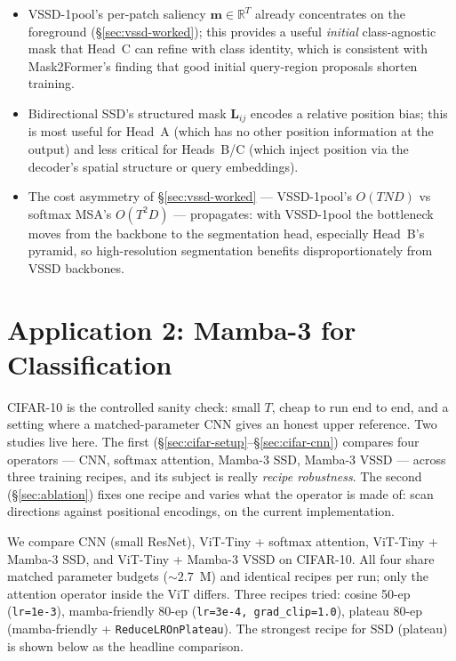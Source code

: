 \documentclass[11pt,a4paper]{article}
\begin{document}
\begin{itemize}
  \item VSSD-1pool's per-patch saliency
        $\bm{m}\in\mathbb{R}^{T}$ already concentrates on the
        foreground (\S\ref{sec:vssd-worked}); this provides a useful
        \emph{initial} class-agnostic mask that Head~C can refine
        with class identity, which is consistent with Mask2Former's
        finding that good initial query-region proposals shorten
        training.
  \item Bidirectional SSD's structured mask $\bm{L}_{ij}$ encodes a
        relative position bias; this is most useful for Head~A
        (which has no other position information at the output) and
        less critical for Heads~B/C (which inject position via the
        decoder's spatial structure or query embeddings).
  \item The cost asymmetry of \S\ref{sec:vssd-worked} — VSSD-1pool's
        $O(TND)$ vs softmax MSA's $O(T^2D)$ — propagates: with VSSD-1pool
        the bottleneck moves from the backbone to the segmentation
        head, especially Head~B's pyramid, so high-resolution
        segmentation benefits disproportionately from VSSD backbones.
\end{itemize}

\section{Application 2: Mamba-3 for Classification}
\label{sec:cifar}

CIFAR-10 is the controlled sanity check: small $T$, cheap to run end to end, and a
setting where a matched-parameter CNN gives an honest upper reference. Two studies
live here. The first (\S\ref{sec:cifar-setup}--\S\ref{sec:cifar-cnn}) compares four
operators --- CNN, softmax attention, Mamba-3 SSD, Mamba-3 VSSD --- across three
training recipes, and its subject is really \emph{recipe robustness}. The second
(\S\ref{sec:ablation}) fixes one recipe and varies what the operator is made of:
scan directions against positional encodings, on the current implementation.

We compare CNN (small ResNet), ViT-Tiny + softmax attention, ViT-Tiny
+ Mamba-3 SSD, and ViT-Tiny + Mamba-3 VSSD on CIFAR-10. All four
share matched parameter budgets ($\sim 2.7$~M) and identical recipes
per run; only the attention operator inside the ViT differs. Three
recipes tried: cosine 50-ep (\texttt{lr=1e-3}), mamba-friendly 80-ep
(\texttt{lr=3e-4, grad\_\allowbreak{}clip=1.0}), plateau 80-ep (mamba-friendly +
\texttt{ReduceLROnPlateau}). The strongest recipe for SSD (plateau)
is shown below as the headline comparison.
\end{document}

